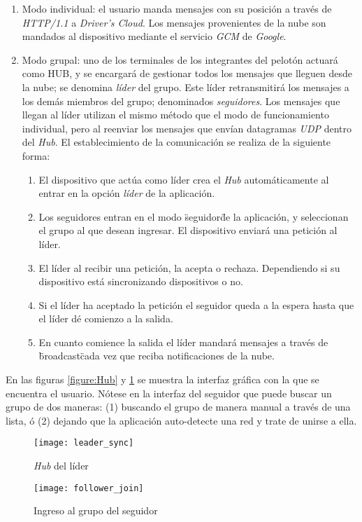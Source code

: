 \begin{enumerate}
	\item Modo individual: el usuario manda mensajes con su posición a través de \emph{HTTP/1.1} a \emph{Driver's Cloud}. Los mensajes provenientes de la nube son mandados al dispositivo mediante el servicio \emph{GCM} de \emph{Google}.	
	\item Modo grupal: uno de los terminales de los integrantes del pelotón actuará como HUB, y se encargará de gestionar todos los mensajes que lleguen desde la nube; se denomina \emph{líder} del grupo. Este líder retransmitirá los mensajes a los demás miembros del grupo; denominados \emph{seguidores}. Los mensajes que llegan al líder utilizan el mismo método que el modo de funcionamiento individual, pero al reenviar los mensajes que envían datagramas \emph{UDP} dentro del \emph{Hub}. El establecimiento de la comunicación se realiza de la siguiente forma:
	\begin{enumerate}
		\item El dispositivo que actúa como líder crea el \emph{Hub} automáticamente al entrar en la opción \emph{líder} de la aplicación.
		\item Los seguidores entran en el modo \"seguidor\" de la aplicación, y seleccionan el grupo al que desean ingresar. El dispositivo enviará una petición al líder.
		\item El líder al recibir una petición, la acepta o rechaza. Dependiendo si su dispositivo está sincronizando dispositivos o no.
		\item Si el líder ha aceptado la petición el seguidor queda a la espera hasta que el líder dé comienzo a la salida.
		\item En cuanto comience la salida el líder mandará mensajes a través de \"broadcast\" cada vez que reciba notificaciones de la nube.
	\end{enumerate}
\end{enumerate}

En las figuras \ref{figure:Hub} y \ref{figure:FollowerJoin} se muestra la interfaz gráfica con la que se encuentra el usuario. Nótese en la interfaz del seguidor que puede buscar un grupo de dos maneras: (1) buscando el grupo de manera manual a través de una lista, ó (2) dejando que la aplicación auto-detecte una red y trate de unirse a ella.			

\begin{figure}[H]
	\begin{minipage}{.5\textwidth}
		\begin{center}
			\texttt{[image: leader\_sync]}
			\caption{\emph{Hub} del líder}
			\label{figure:Hub}
		\end{center}
	\end{minipage}
\begin{minipage}{.5\textwidth}
	\begin{center}
		\texttt{[image: follower\_join]}
		\caption{Ingreso al grupo del seguidor}
		\label{figure:FollowerJoin}
	\end{center}
\end{minipage}
\end{figure}
		
